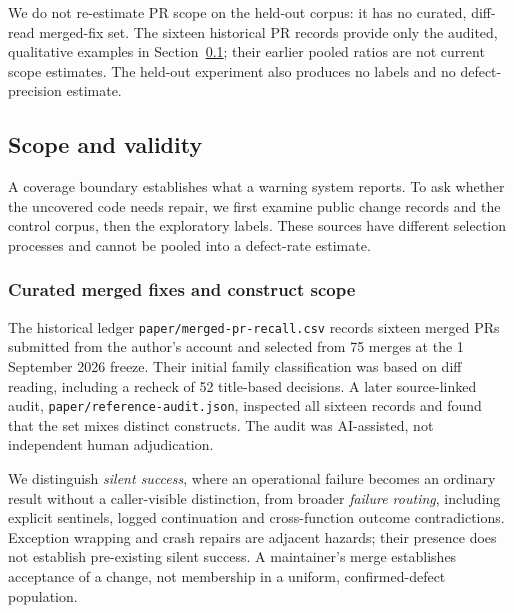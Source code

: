 \documentclass[10pt,a4paper]{article}
\begin{document}
We do not re-estimate PR scope on the held-out corpus: it has no curated,
diff-read merged-fix set. The sixteen historical PR records provide only the audited, qualitative
examples in Section~\ref{sec:validation}; their earlier pooled ratios
are not current scope estimates. The held-out
experiment also produces no labels and no defect-precision estimate.

\subsection{Scope and validity}
\label{sec:validation}

A coverage boundary establishes what a warning system reports. To ask
whether the uncovered code needs repair, we first examine public change records
and the control corpus, then the exploratory labels. These sources have
different selection processes and cannot be pooled into a defect-rate estimate.

\subsubsection{Curated merged fixes and construct scope}
\label{sec:rq3}

The historical ledger \texttt{paper/merged-pr-recall.csv} records sixteen
merged PRs submitted from the author's account and selected from 75 merges
at the 1 September 2026 freeze. Their initial family classification was
based on diff reading, including a recheck of 52 title-based decisions.
A later source-linked audit, \texttt{paper/reference-audit.json}, inspected
all sixteen records and found that the set mixes distinct constructs.
The audit was AI-assisted, not independent human adjudication.

We distinguish \emph{silent success}, where an operational failure becomes
an ordinary result without a caller-visible distinction, from broader
\emph{failure routing}, including explicit sentinels, logged continuation
and cross-function outcome contradictions. Exception wrapping and crash
repairs are adjacent hazards; their presence does not establish pre-existing
silent success. A maintainer's merge establishes acceptance of a change,
not membership in a uniform, confirmed-defect population.
\end{document}
